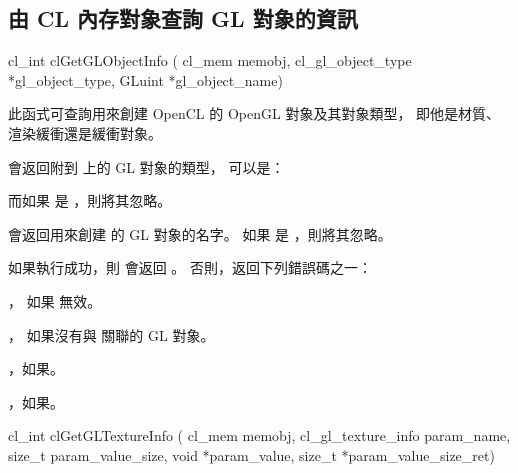 \subsection{由 CL 內存對象查詢 GL 對象的資訊}


\startCLFUNC
cl_int clGetGLObjectInfo (
		cl_mem memobj,
		cl_gl_object_type *gl_object_type,
		GLuint *gl_object_name)
\stopCLFUNC

此函式可查詢用來創建 OpenCL 的 OpenGL 對象及其對象類型，
即他是材質、渲染緩衝還是緩衝對象。

 會返回附到  上的 GL 對象的類型，
可以是：
\startigBase[indentnext=no]
\item {}
\item {}
\item {}
\item {}
\item {}
\item {}
\item {}
\item {}
\stopigBase
而如果  是 ，則將其忽略。

 會返回用來創建  的 GL 對象的名字。
如果  是 ，則將其忽略。

如果執行成功，則  會返回 。
否則，返回下列錯誤碼之一：
\startigBase
\item {}，
如果  無效。

\item {}，
如果沒有與  關聯的 GL 對象。

\item {}，如果\scdevfailres。

\item {}，如果\schostfailres。
\stopigBase


\startCLFUNC
cl_int clGetGLTextureInfo (
			cl_mem memobj,
			cl_gl_texture_info param_name,
			size_t param_value_size,
			void *param_value,
			size_t *param_value_size_ret)
\stopCLFUNC


